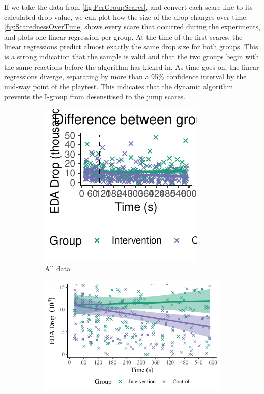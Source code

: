 \documentclass[12pt,a4paper]{article}\usepackage[]{graphicx}\usepackage[]{color}
\makeatletter
\def\maxwidth{ %
  \ifdim\Gin@nat@width>\linewidth
    \linewidth
  \else
    \Gin@nat@width
  \fi
}
\makeatother
\begin{document}
If we take the data from \vref{fig:PerGroupScares}, and convert each scare line to its calculated drop value, we can plot how the size of the drop changes over time.
\vref{fig:ScarednessOverTime} shows every scare that occurred during the experiments, and plots one linear regression per group.
At the time of the first scares, the linear regressions predict almost exactly the same drop size for both groups.
This is a strong indication that the sample is valid and that the two groups begin with the same reactions before the algorithm has kicked in.
As time goes on, the linear regressions diverge, separating by more than a 95\% confidence interval by the mid-way point of the playtest.
This indicates that the dynamic algorithm prevents the I-group from desensitised to the jump scares.

\begin{figure}[htb]
	\centering
	\begin{subfigure}[t]{.49\linewidth}


{\centering \includegraphics[width=\maxwidth]{figure/ScarednessOverTime-1} 

}



		\caption{All data}
	\end{subfigure}
	\begin{subfigure}[t]{.49\linewidth}


{\centering \includegraphics[width=\maxwidth]{figure/ScarednessOverTimeCrop-1} 

}
\end{subfigure}
\end{figure}
\end{document}
